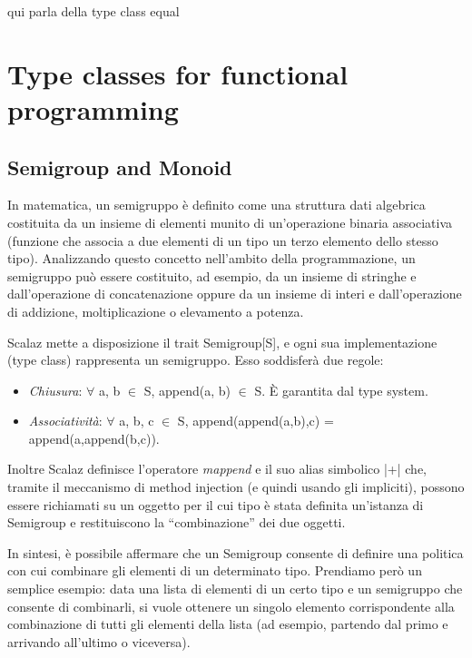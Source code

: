qui parla della type class equal



\section{Type classes for functional programming}

\newpage

\subsection{Semigroup and Monoid}

In matematica, un semigruppo è definito come una struttura dati algebrica costituita da un insieme di elementi munito di un'operazione binaria associativa (funzione che associa a due elementi di un tipo un terzo elemento dello stesso tipo). Analizzando questo concetto nell'ambito della programmazione, un semigruppo può essere costituito, ad esempio, da un insieme di stringhe e dall'operazione di concatenazione oppure da un insieme di interi e dall'operazione di addizione, moltiplicazione o elevamento a potenza.

Scalaz mette a disposizione il trait Semigroup[S], e ogni sua implementazione (type class) rappresenta un semigruppo. Esso soddisferà due regole:

\begin{itemize}
\item \textit{Chiusura}: $\forall$ a, b $\in$ S, append(a, b) $\in$ S. È garantita dal type system.
\item \textit{Associatività}: $\forall$ a, b, c $\in$ S, append(append(a,b),c) = append(a,append(b,c)).
\end{itemize}

Inoltre Scalaz definisce l'operatore \textit{mappend} e il suo alias simbolico |+| che, tramite il meccanismo di method injection (e quindi usando gli impliciti), possono essere richiamati su un oggetto per il cui tipo è stata definita un'istanza di Semigroup e restituiscono la ``combinazione'' dei due oggetti.



In sintesi, è possibile affermare che un Semigroup consente di definire una politica con cui combinare gli elementi di un determinato tipo. Prendiamo però un semplice esempio: data una lista di elementi di un certo tipo e un semigruppo che consente di combinarli, si vuole ottenere un singolo elemento corrispondente alla combinazione di tutti gli elementi della lista (ad esempio, partendo dal primo e arrivando all'ultimo o viceversa).

